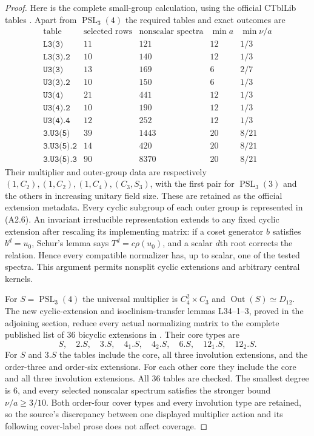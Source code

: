 \begin{proof}
Here is the complete small-group calculation, using the official
CTblLib tables \cite{SPOR:CTblLib}.  Apart from $\operatorname{PSL}_3(4)$
the required tables and exact outcomes are
\[
\begin{array}{l|r|r|r|c}
\text{table}&\text{selected rows}&\text{nonscalar spectra}&
 \min a&\min\nu/a\\\hline
\texttt{L3(3)}&11&121&12&1/3\\
\texttt{L3(3).2}&10&140&12&1/3\\
\texttt{U3(3)}&13&169&6&2/7\\
\texttt{U3(3).2}&10&150&6&1/3\\
\texttt{U3(4)}&21&441&12&1/3\\
\texttt{U3(4).2}&10&190&12&1/3\\
\texttt{U3(4).4}&12&252&12&1/3\\
\texttt{3.U3(5)}&39&1443&20&8/21\\
\texttt{3.U3(5).2}&14&420&20&8/21\\
\texttt{3.U3(5).3}&90&8370&20&8/21
\end{array}                                                     \tag{A2.6}
\]
Their multiplier and outer-group data are respectively
$(1,C_2),(1,C_2),(1,C_4),(C_3,S_3)$, with the first pair for
$\operatorname{PSL}_3(3)$ and the others in increasing unitary
field size.  These are retained as the official extension metadata.
Every cyclic subgroup of each outer group is represented in (A2.6).
An invariant irreducible representation extends to any fixed
cyclic extension after rescaling its implementing matrix: if a
coset generator $b$ satisfies $b^d=u_0$, Schur's lemma says
$T^d=c\rho(u_0)$, and a scalar $d$th root corrects the relation.
Hence every compatible normalizer has, up to scalar, one of the
tested spectra.  This argument permits nonsplit cyclic extensions
and arbitrary central kernels.

For $S=\operatorname{PSL}_3(4)$ the universal multiplier is
$C_4^2\times C_3$ and $\operatorname{Out}(S)\simeq D_{12}$.
The new cyclic-extension and isoclinism-transfer lemmas
L34--1--3, proved in the adjoining section, reduce every actual
normalizing matrix to the complete published list of $36$
bicyclic extensions in \cite[\S3.3.1, Lemma~3.1]{D:BMO2017}.
Their core types are
\[
 S,\quad2.S,\quad3.S,\quad4_1.S,\quad4_2.S,\quad6.S,
 \quad12_1.S,\quad12_2.S.                                \tag{A2.7}
\]
For $S$ and $3.S$ the tables include the core, all three
involution extensions, and the order-three and order-six extensions.
For each other core they include the core and all three involution
extensions.  All $36$ tables are checked.  The smallest degree is
$6$, and every selected nonscalar spectrum satisfies the stronger
bound $\nu/a\ge3/10$.  Both order-four cover types and every
involution type are retained, so the source's discrepancy between
one displayed multiplier action and its following cover-label prose
does not affect coverage.


\end{proof}

